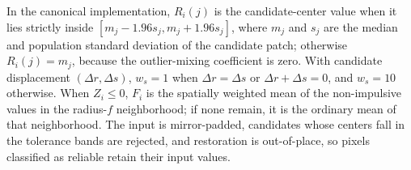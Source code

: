 \documentclass[pdflatex,iicol,sn-mathphys-num]{sn-jnl}
\newif\ifshowportuguese
\newcommand{\pt}[1]{\ifshowportuguese\par\begingroup\small\color{blue!55!black}\noindent\textbf{PT: }#1\par\endgroup\fi}
\begin{document}
In the canonical implementation, $R_i(j)$ is the candidate-center value when it lies strictly inside $[m_j-1.96s_j,m_j+1.96s_j]$, where $m_j$ and $s_j$ are the median and population standard deviation of the candidate patch; otherwise $R_i(j)=m_j$, because the outlier-mixing coefficient is zero. With candidate displacement $(\Delta r,\Delta s)$, $w_s=1$ when $\Delta r=\Delta s$ or $\Delta r+\Delta s=0$, and $w_s=10$ otherwise. When $Z_i\leq0$, $F_i$ is the spatially weighted mean of the non-impulsive values in the radius-$f$ neighborhood; if none remain, it is the ordinary mean of that neighborhood. The input is mirror-padded, candidates whose centers fall in the tolerance bands are rejected, and restoration is out-of-place, so pixels classified as reliable retain their input values.
\pt{Na implementação canônica, $R_i(j)$ é o valor do centro candidato quando ele está estritamente dentro de $[m_j-1.96s_j,m_j+1.96s_j]$, em que $m_j$ e $s_j$ são a mediana e o desvio-padrão populacional do patch candidato; caso contrário, $R_i(j)=m_j$, pois o coeficiente de mistura de outlier é zero. Com deslocamento candidato $(\Delta r,\Delta s)$, $w_s=1$ quando $\Delta r=\Delta s$ ou $\Delta r+\Delta s=0$, e $w_s=10$ nos demais casos. Quando $Z_i\leq0$, $F_i$ é a média espacialmente ponderada dos valores não impulsivos na vizinhança de raio $f$; se nenhum permanece, é a média usual dessa vizinhança. A entrada recebe padding espelhado, candidatos cujos centros estão nas faixas de tolerância são rejeitados, e a restauração é fora do lugar, de modo que pixels classificados como confiáveis preservam seus valores de entrada.}
\end{document}
